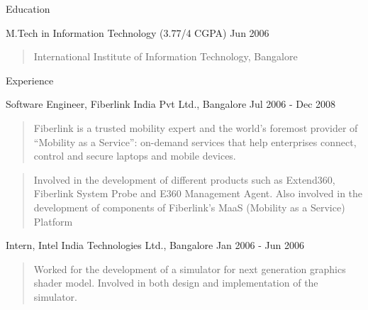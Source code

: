 \documentclass{resume}
\author{Ashish Tulsian}
\begin{document}
 \maketitle

\begin{category}{Education}{}

    \item {\topic M.Tech in Information Technology}
        {\footnotesize(3.77/4 CGPA)}
        {\period Jun 2006}
        \begin{quote}
            International Institute of Information Technology, Bangalore
        \end{quote}

\end{category}


\begin{category}{Experience}{}

    \item {\topic Software Engineer,} Fiberlink India Pvt Ltd., Bangalore
        {\period Jul 2006 - Dec 2008}
        \begin{quote}
            Fiberlink is a trusted mobility expert and the world’s foremost
            provider of “Mobility as a Service”: on-demand services that help
            enterprises connect, control and secure laptops and mobile devices.
        \end{quote}
        \begin{quote}
            Involved in the development of different products such as
            Extend360, Fiberlink System Probe and E360 Management Agent. Also
            involved in the development of components of Fiberlink’s MaaS
            (Mobility as a Service) Platform
        \end{quote}

    \item {\topic Intern,} Intel India Technologies Ltd., Bangalore
        {\period Jan 2006 - Jun 2006}
        \begin{quote}
            Worked for the development of a simulator for next generation
            graphics shader model. Involved in both design and implementation
            of the simulator.
        \end{quote}

\end{category}
\end{document}

